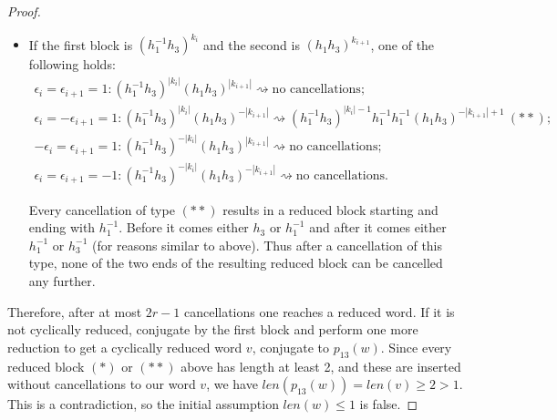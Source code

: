 \documentclass[11pt]{article}
\newenvironment{myequation}
    {
        \begin{equation*}
        \begin{gathered}
    }
    { 
        \end{gathered} 
        \end{equation*}
    }
\begin{document}
\begin{proof}
\begin{itemize}
            Every cancellation of type $(*)$ results in a reduced block starting and ending with $h_1$. Before it comes either $h_3$ or $h_1$ (since $(h_1^{-1} h_3)^{k_{i-1}}$ ends with one of these symbols), and after it comes either $h_1$ or $h_3^{-1}$ (for similar reasons). Thus after a cancellation of this type, none of the two ends of the resulting reduced block can be cancelled any further.
            
        \item If the first block is $(h_1^{-1} h_3)^{k_i}$ and the second is $(h_1 h_3)^{k_{i+1}}$, one of the following holds:
        \begin{myequation}
                \epsilon_i = \epsilon_{i+1} = 1: (h_1^{-1} h_3)^{|k_i|} (h_1 h_3)^{|k_{i+1}|} \rightsquigarrow \text{no cancellations} ; \\
                \epsilon_i = -\epsilon_{i+1} = 1: (h_1^{-1} h_3)^{|k_i|} (h_1 h_3)^{-|k_{i+1}|} \rightsquigarrow (h_1^{-1} h_3)^{|k_i|-1} h_1^{-1} h_1^{-1} (h_1 h_3)^{-|k_{i+1}|+1} \ (**) ; \\
                - \epsilon_i = \epsilon_{i+1} = 1: (h_1^{-1} h_3)^{-|k_i|} (h_1 h_3)^{|k_{i+1}|} \rightsquigarrow \text{no cancellations} ; \\
                \epsilon_i = \epsilon_{i+1} = -1: (h_1^{-1} h_3)^{-|k_i|} (h_1 h_3)^{-|k_{i+1}|} \rightsquigarrow \text{no cancellations}.
            \end{myequation}
            
            Every cancellation of type $(**)$ results in a reduced block starting and ending with $h_1^{-1}$. Before it comes either $h_3$ or $h_1^{-1}$ and after it comes either $h_1^{-1}$ or $h_3^{-1}$ (for reasons similar to above). Thus after a cancellation of this type, none of the two ends of the resulting reduced block can be cancelled any further.
        \end{itemize}
        
        Therefore, after at most $2r-1$ cancellations one reaches a reduced word. If it is not cyclically reduced, conjugate by the first block and perform one more reduction to get a cyclically reduced word $v$, conjugate to $p_{13}(w)$. Since every reduced block $(*)$ or $(**)$ above has length at least 2, and these are inserted without cancellations to our word $v$, we have $len(p_{13}(w)) = len(v) \geq 2 > 1$. This is a contradiction, so the initial assumption $len(w) \leq 1$ is false.
    \end{proof}
\end{document}
